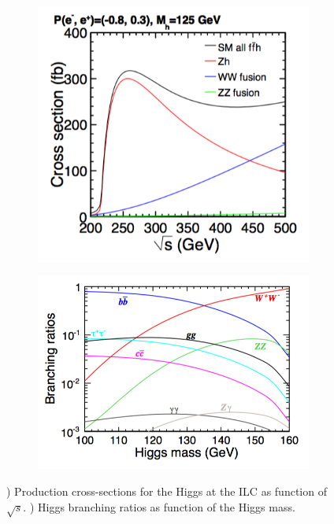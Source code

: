 \begin{figure}[htbp!]
  \centering
  \begin{subfigure}[t]{0.49\textwidth}
    \includegraphics[width=1.\linewidth]{chap2/fig/HiggsXS.png}
    \caption{} \label{fig:HiggsXS}
  \end{subfigure}
  \hfill
  \begin{subfigure}[t]{0.49\textwidth}
    \includegraphics[width=1.\linewidth]{chap2/fig/HiggsBR.png}
    \caption{} \label{fig:HiggsBR}
  \end{subfigure}
  \caption{) Production cross-sections for the Higgs at the ILC as function of $\sqrt{s}$. ) Higgs branching ratios as function of the Higgs mass.}
\end{figure}

